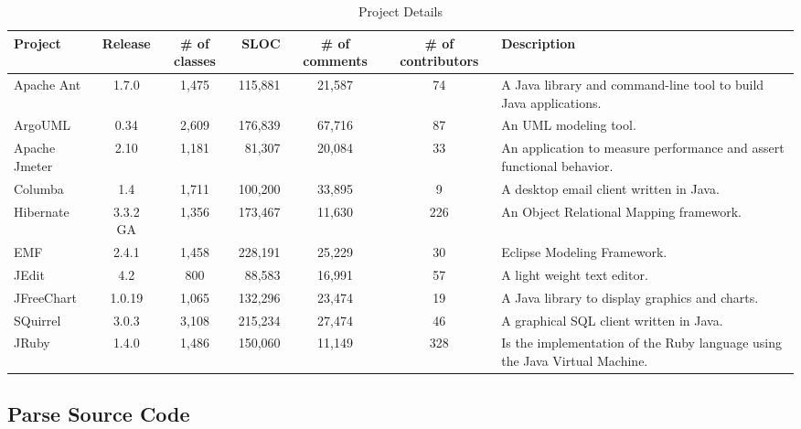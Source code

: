 \begin{table}[!tbh]
    \begin{center}
    \caption{Project Details}
    \label{tab:project_details}
            \begin{tabular}{l| c c r c c | p{2.0in}}
            \toprule
            \textbf{Project}   & \textbf{Release}  & \textbf{\# of classes}   & \textbf{SLOC}    & \textbf{\# of comments}  & \textbf{\# of contributors} & \textbf{Description}\\ \midrule 
            Apache Ant     & 1.7.0    & 1,475 & 115,881 & 21,587 & 74  & A Java library and command-line tool to build Java applications.\\
            ArgoUML        & 0.34     & 2,609 & 176,839 & 67,716 & 87  & An UML modeling tool.\\
            Apache Jmeter  & 2.10     & 1,181 &  81,307 & 20,084 & 33  & An application to measure performance and assert functional behavior.\\
            Columba        & 1.4      & 1,711 & 100,200 & 33,895 & 9   & A desktop email client written in Java.\\
            Hibernate      & 3.3.2 GA & 1,356 & 173,467 & 11,630 & 226 & An Object Relational Mapping framework.\\
            EMF            & 2.4.1    & 1,458 & 228,191 & 25,229 & 30  & Eclipse Modeling Framework.\\
            JEdit          & 4.2      &   800 &  88,583 & 16,991 & 57  & A light weight text editor.\\
            JFreeChart     & 1.0.19   & 1,065 & 132,296 & 23,474 & 19  & A Java library to display graphics and charts.\\
            SQuirrel       & 3.0.3    & 3,108 & 215,234 & 27,474 & 46  & A graphical SQL client written in Java.\\ 
            JRuby          & 1.4.0    & 1,486 & 150,060 & 11,149 & 328 & Is the implementation of the Ruby language using the Java Virtual Machine.\\ \bottomrule
        \end{tabular}
    \end{center}
\end{table}


\subsection{Parse Source Code} %
\label{sub:parse_source_code}

